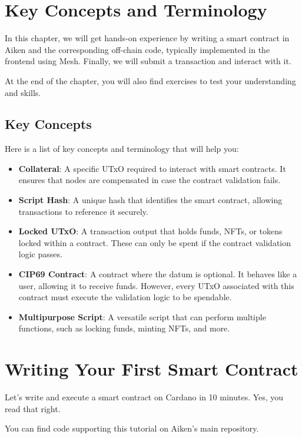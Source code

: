 \section{Key Concepts and Terminology}

In this chapter, we will get hands-on experience by writing a smart contract in Aiken and the corresponding off-chain code, typically implemented in the frontend using Mesh. Finally, we will submit a transaction and interact with it.

At the end of the chapter, you will also find exercises to test your understanding and skills.

\subsection{Key Concepts}

Here is a list of key concepts and terminology that will help you:

\begin{itemize}
  \item \textbf{Collateral}: A specific UTxO required to interact with smart contracts. It ensures that nodes are compensated in case the contract validation fails.
  \item \textbf{Script Hash}: A unique hash that identifies the smart contract, allowing transactions to reference it securely.
  \item \textbf{Locked UTxO}: A transaction output that holds funds, NFTs, or tokens locked within a contract. These can only be spent if the contract validation logic passes.
  \item \textbf{CIP69 Contract}: A contract where the datum is optional. It behaves like a user, allowing it to receive funds. However, every UTxO associated with this contract must execute the validation logic to be spendable.
  \item \textbf{Multipurpose Script}: A versatile script that can perform multiple functions, such as locking funds, minting NFTs, and more.
\end{itemize}


\section{Writing Your First Smart Contract}

Let's write and execute a smart contract on Cardano in 10 minutes. Yes, you read that right.

You can find code supporting this tutorial on Aiken's main repository.

